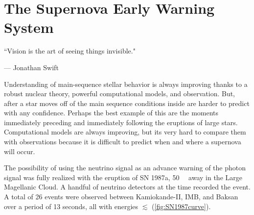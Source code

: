 %
%
%
%


\chapter{The Supernova Early Warning System}
	\label{snews_chapter}
	\vspace{-0.2in}

	\begin{quoting}
		\noindent \large ``Vision is the art of seeing things invisible." \normalsize

		--- Jonathan Swift
	\end{quoting}

	 Understanding of main-sequence stellar behavior is always improving thanks to a robust nuclear theory, powerful computational models, and observation. But, after a star moves off of the main sequence conditions inside are harder to predict with any confidence. Perhaps the best example of this are the moments immediately preceding and immediately following the eruptions of large stars. Computational models are always improving, but its very hard to compare them with observations because it is difficult to predict when and where a supernova will occur. 

	The possibility of using the neutrino signal as an advance warning of the photon signal was fully realized with the eruption of SN 1987a, \SI{50}{\kilo\parsec} away in the Large Magellanic Cloud. A handful of neutrino detectors at the time recorded the event. A total of 26 events were observed between Kamiokande-II, IMB, and Baksan over a period of 13 seconds, all with energies $\lesssim$ \nolinebreak {} (\FIG \ref{fig:SN1987curve})\cite{kii1987a,imb_1987a,baksan1987a}.

